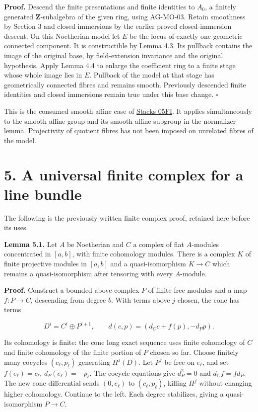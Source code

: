 \documentclass[11pt,a4paper,openany]{report}
\begin{document}
\textbf{Proof.} Descend the finite presentations and finite identities to \(A_0\), a finitely generated \(\mathbf Z\)-subalgebra of the given ring, using AG-MO-03. Retain smoothness by Section 3 and closed immersions by the earlier proved closed-immersion descent. On this Noetherian model let \(E\) be the locus of exactly one geometric connected component. It is constructible by Lemma 4.3. Its pullback contains the image of the original base, by field-extension invariance and the original hypothesis. Apply Lemma 4.4 to enlarge the coefficient ring to a finite stage whose whole image lies in \(E\). Pullback of the model at that stage has geometrically connected fibres and remains smooth. Previously descended finite identities and closed immersions remain true under this base change. \(\square\)

This is the consumed smooth affine case of \href{https://stacks.math.columbia.edu/tag/05FI}{Stacks 05FI}. It applies simultaneously to the smooth affine group and its smooth affine subgroup in the normalizer lemma. Projectivity of quotient fibres has not been imposed on unrelated fibres of the model.

\section{5. A universal finite complex for a line bundle}\label{AG-RG-S02-a-universal-finite-complex-for-a-line-bundle}

The following is the previously written finite complex proof, retained here before its uses.

\textbf{Lemma 5.1.} Let \(A\) be Noetherian and \(C\) a complex of flat \(A\)-modules concentrated in \([a,b]\), with finite cohomology modules. There is a complex \(K\) of finite projective modules in \([a,b]\) and a quasi-isomorphism \(K\to C\) which remains a quasi-isomorphism after tensoring with every \(A\)-module.

\textbf{Proof.} Construct a bounded-above complex \(P\) of finite free modules and a map \(f:P\to C\), descending from degree \(b\). With terms above \(j\) chosen, the cone has terms

\[
D^i=C^i\oplus P^{i+1},\qquad
d(c,p)=(d_Cc+f(p),-d_Pp).
\]

Its cohomology is finite: the cone long exact sequence uses finite cohomology of \(C\) and finite cohomology of the finite portion of \(P\) chosen so far. Choose finitely many cocycles \((c_\ell,p_\ell)\) generating \(H^j(D)\). Let \(P^j\) be free on \(e_\ell\), and set \(f(e_\ell)=c_\ell\), \(d_P(e_\ell)=-p_\ell\). The cocycle equations give \(d_P^2=0\) and \(d_Cf=fd_P\). The new cone differential sends \((0,e_\ell)\) to \((c_\ell,p_\ell)\), killing \(H^j\) without changing higher cohomology. Continue to the left. Each degree stabilizes, giving a quasi-isomorphism \(P\to C\).
\end{document}
